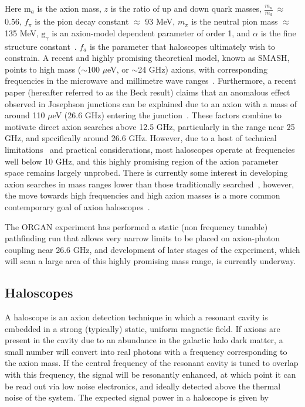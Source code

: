 \documentclass[preprint]{elsarticle}
\begin{document}
Here $\text{m}_a$ is the axion mass, $z$ is the ratio of up and down quark masses, $\frac{m_u}{m_d}~\approx$ 0.56, $f_\pi$ is the pion decay constant $\approx$ 93 MeV, $m_\pi$ is the neutral pion mass $\approx$ 135 MeV, $\text{g}_\gamma$ is an axion-model dependent parameter of order 1, and $\alpha$ is the fine structure constant~\cite{K79,Kim2010,DFS81,SVZ80,Dine1983}. $f_a$ is the parameter that haloscopes ultimately wish to constrain. A recent and highly promising theoretical model, known as SMASH, points to high mass ($\sim$100 $\mu$eV, or $\sim$24 GHz) axions, with corresponding frequencies in the microwave and millimetre wave ranges~\cite{SMASH}. Furthermore, a recent paper (hereafter referred to as the Beck result) claims that an anomalous effect observed in Josephson junctions can be explained due to an axion with a mass of around 110 $\mu$eV (26.6 GHz) entering the junction~\cite{Beck2013,Beck2014}. These factors combine to motivate direct axion searches above 12.5 GHz, particularly in the range near 25 GHz, and specifically around 26.6 GHz. However, due to a host of technical limitations~\cite{darin2001} and practical considerations, most haloscopes operate at frequencies well below 10 GHz, and this highly promising region of the axion parameter space remains largely unprobed. There is currently some interest in developing axion searches in mass ranges lower than those traditionally searched~\cite{Sikivie2014a,McAllister:2016fux,ABRACADABRA}, however, the move towards high frequencies and high axion masses is a more common contemporary goal of axion haloscopes~\cite{MADMAX,ADMXHF2014,YaleAxion,CULTASK,Jaeckel2013,SpringsPaper}.

The ORGAN experiment has performed a static (non frequency tunable) pathfinding run that allows very narrow limits to be placed on axion-photon coupling near 26.6 GHz, and development of later stages of the experiment, which will scan a large area of this highly promising mass range, is currently underway.
\subsection{Haloscopes}
A haloscope is an axion detection technique in which a resonant cavity is embedded in a strong (typically) static, uniform magnetic field. If axions are present in the cavity due to an abundance in the galactic halo dark matter, a small number will convert into real photons with a frequency corresponding to the axion mass. If the central frequency of the resonant cavity is tuned to overlap with this frequency, the signal will be resonantly enhanced, at which point it can be read out via low noise electronics, and ideally detected above the thermal noise of the system. The expected signal power in a haloscope is given by~\cite{Daw:1998jm}
\end{document}
